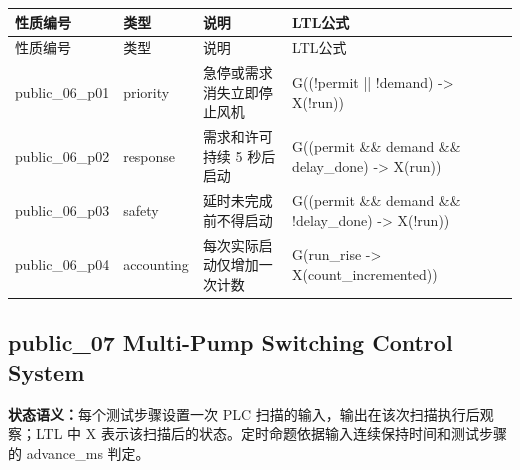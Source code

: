 \begin{longtable}{L{2.3cm}L{1.7cm}L{4.1cm}L{5.2cm}}

\toprule

性质编号 & 类型 & 说明 & LTL公式\\

\midrule

\endfirsthead

\toprule

性质编号 & 类型 & 说明 & LTL公式\\

\midrule

\endhead

{\ttfamily public\_06\_p01} & priority & 急停或需求消失立即停止风机 & {\ttfamily G((!permit || !demand) -> X(!run))}\\

{\ttfamily public\_06\_p02} & response & 需求和许可持续 5 秒后启动 & {\ttfamily G((permit \&\& demand \&\& delay\_done) -> X(run))}\\

{\ttfamily public\_06\_p03} & safety & 延时未完成前不得启动 & {\ttfamily G((permit \&\& demand \&\& !delay\_done) -> X(!run))}\\

{\ttfamily public\_06\_p04} & accounting & 每次实际启动仅增加一次计数 & {\ttfamily G(run\_rise -> X(count\_incremented))}\\

\bottomrule

\end{longtable}

\subsection{{\ttfamily public\_07} Multi-Pump Switching Control System}

\noindent\textbf{状态语义：}每个测试步骤设置一次 PLC 扫描的输入，输出在该次扫描执行后观察；LTL 中 X 表示该扫描后的状态。定时命题依据输入连续保持时间和测试步骤的 advance\_ms 判定。

